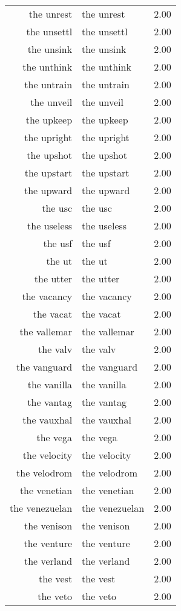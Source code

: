 \begin{table}[ht]
\begin{tabular}{rlr}
  the unrest & the unrest & 2.00 \\ 
  the unsettl & the unsettl & 2.00 \\ 
  the unsink & the unsink & 2.00 \\ 
  the unthink & the unthink & 2.00 \\ 
  the untrain & the untrain & 2.00 \\ 
  the unveil & the unveil & 2.00 \\ 
  the upkeep & the upkeep & 2.00 \\ 
  the upright & the upright & 2.00 \\ 
  the upshot & the upshot & 2.00 \\ 
  the upstart & the upstart & 2.00 \\ 
  the upward & the upward & 2.00 \\ 
  the usc & the usc & 2.00 \\ 
  the useless & the useless & 2.00 \\ 
  the usf & the usf & 2.00 \\ 
  the ut & the ut & 2.00 \\ 
  the utter & the utter & 2.00 \\ 
  the vacancy & the vacancy & 2.00 \\ 
  the vacat & the vacat & 2.00 \\ 
  the vallemar & the vallemar & 2.00 \\ 
  the valv & the valv & 2.00 \\ 
  the vanguard & the vanguard & 2.00 \\ 
  the vanilla & the vanilla & 2.00 \\ 
  the vantag & the vantag & 2.00 \\ 
  the vauxhal & the vauxhal & 2.00 \\ 
  the vega & the vega & 2.00 \\ 
  the velocity & the velocity & 2.00 \\ 
  the velodrom & the velodrom & 2.00 \\ 
  the venetian & the venetian & 2.00 \\ 
  the venezuelan & the venezuelan & 2.00 \\ 
  the venison & the venison & 2.00 \\ 
  the venture & the venture & 2.00 \\ 
  the verland & the verland & 2.00 \\ 
  the vest & the vest & 2.00 \\ 
  the veto & the veto & 2.00 \\ 

\end{tabular}
\end{table}
